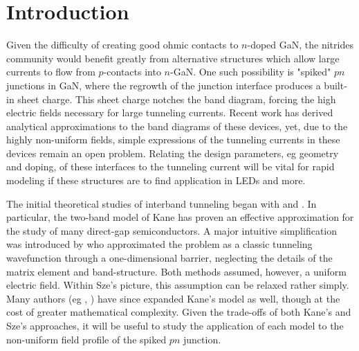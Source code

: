 \section{Introduction}
Given the difficulty of creating good ohmic contacts to $n$-doped GaN, the nitrides community would benefit greatly from alternative structures which allow large currents to flow from $p$-contacts into $n$-GaN.  One such possibility is "spiked" $pn$ junctions in GaN, where the regrowth of the junction interface produces a built-in sheet charge.  This sheet charge notches the band diagram, forcing the high electric fields necessary for large tunneling currents.  Recent work has derived analytical approximations to the band diagrams of these devices, yet, due to the highly non-uniform fields, simple expressions of the tunneling currents in these devices remain an open problem.  Relating the design parameters, eg geometry and doping, of these interfaces to the tunneling current will be vital for rapid modeling if these structures are to find application in LEDs and more.

The initial theoretical studies of interband tunneling began with \cite{Keldysh_1958} and \cite{Kane_1960}.  In particular, the two-band model of Kane has proven an effective approximation for the study of many direct-gap semiconductors.  A major intuitive simplification was introduced by \cite{Sze_2nd} who approximated the problem as a classic tunneling wavefunction through a one-dimensional barrier, neglecting the details of the matrix element and band-structure.  Both methods assumed, however, a uniform electric field. Within Sze's picture, this assumption can be relaxed rather simply.  Many authors (eg \cite{Takayanagi_1991}, \cite{Tanaka_1994}) have since expanded Kane's model as well, though at the cost of greater mathematical complexity.  Given the trade-offs of both Kane's and Sze's approaches, it will be useful to study the application of each model to the non-uniform field profile of the spiked $pn$ junction.
